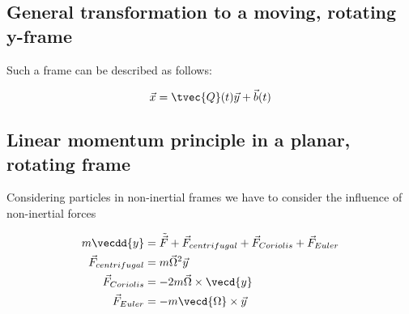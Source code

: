\documentclass[10pt,a4paper]{scrartcl}
\begin{document}
\begin{multicols*}{2}
\subsection{General transformation to a moving, rotating y-frame}

Such a frame can be described as follows:


\begin{equation*}
\vec{x}=\tvec{Q}(t)\vec{y}+\vec{b}(t)
\end{equation*}


\subsection{Linear momentum principle in a planar, rotating frame}

Considering particles in non-inertial frames we have to consider the influence of non-inertial forces

\begin{equation*}
\begin{aligned}
m\vecdd{y}&=\tilde{\vec{F}}+\vec{F}_{centrifugal}+\vec{F}_{Coriolis}+\vec{F}_{Euler}\\
\vec{F}_{centrifugal}&=m\vec{\Omega}^2\vec{y}\\
\vec{F}_{Coriolis}&=-2m\vec{\Omega}\times\vecd{y}\\
\vec{F}_{Euler}&=-m\vecd{\Omega}\times\vec{y}
\end{aligned}
\end{equation*}


\end{multicols*}
\end{document}
